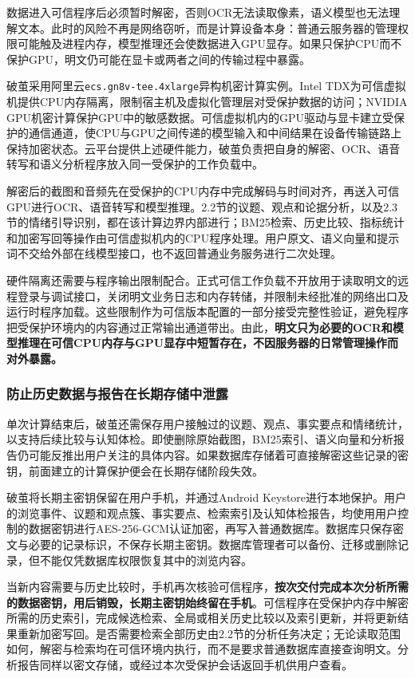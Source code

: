 数据进入可信程序后必须暂时解密，否则OCR无法读取像素，语义模型也无法理解文本。此时的风险不再是网络窃听，而是计算设备本身：普通云服务器的管理权限可能触及进程内存，模型推理还会使数据进入GPU显存。如果只保护CPU而不保护GPU，明文仍可能在显卡或两者之间的传输过程中暴露。

破茧采用阿里云\texttt{ecs.gn8v-tee.4xlarge}异构机密计算实例。Intel TDX为可信虚拟机提供CPU内存隔离，限制宿主机及虚拟化管理层对受保护数据的访问；NVIDIA GPU机密计算保护GPU中的敏感数据。可信虚拟机内的GPU驱动与显卡建立受保护的通信通道，使CPU与GPU之间传递的模型输入和中间结果在设备传输链路上保持加密状态。云平台提供上述硬件能力，破茧负责把自身的解密、OCR、语音转写和语义分析程序放入同一受保护的工作负载中。

解密后的截图和音频先在受保护的CPU内存中完成解码与时间对齐，再送入可信GPU进行OCR、语音转写和模型推理。2.2节的议题、观点和论据分析，以及2.3节的情绪引导识别，都在该计算边界内部进行；BM25检索、历史比较、指标统计和加密写回等操作由可信虚拟机内的CPU程序处理。用户原文、语义向量和提示词不交给外部在线模型接口，也不返回普通业务服务进行二次处理。

硬件隔离还需要与程序输出限制配合。正式可信工作负载不开放用于读取明文的远程登录与调试接口，关闭明文业务日志和内存转储，并限制未经批准的网络出口及运行时程序加载。这些限制作为可信版本配置的一部分接受完整性验证，避免程序把受保护环境内的内容通过正常输出通道带出。由此，\textbf{明文只为必要的OCR和模型推理在可信CPU内存与GPU显存中短暂存在，不因服务器的日常管理操作而对外暴露。}

\subsubsection{防止历史数据与报告在长期存储中泄露}\label{section:2.4.5}

单次计算结束后，破茧还需保存用户接触过的议题、观点、事实要点和情绪统计，以支持后续比较与认知体检。即使删除原始截图，BM25索引、语义向量和分析报告仍可能反推出用户关注的具体内容。如果数据库存储着可直接解密这些记录的密钥，前面建立的计算保护便会在长期存储阶段失效。

破茧将长期主密钥保留在用户手机，并通过Android Keystore进行本地保护。用户的浏览事件、议题和观点簇、事实要点、检索索引及认知体检报告，均使用用户控制的数据密钥进行AES-256-GCM认证加密，再写入普通数据库。数据库只保存密文与必要的记录标识，不保存长期主密钥。数据库管理者可以备份、迁移或删除记录，但不能仅凭数据库权限恢复其中的浏览内容。

当新内容需要与历史比较时，手机再次核验可信程序，\textbf{按次交付完成本次分析所需的数据密钥，用后销毁，长期主密钥始终留在手机}。可信程序在受保护内存中解密所需的历史索引，完成候选检索、全局或相关历史比较以及索引更新，并将更新结果重新加密写回。是否需要检索全部历史由2.2节的分析任务决定；无论读取范围如何，解密与检索均在可信环境内执行，而不是要求普通数据库直接查询明文。分析报告同样以密文存储，或经过本次受保护会话返回手机供用户查看。

